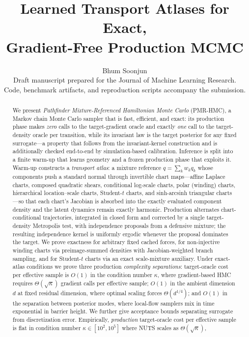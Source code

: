 \documentclass[11pt]{article}
\title{Learned Transport Atlases for Exact,\\ Gradient-Free Production MCMC}
\author{Bhum Soonjun\\[2pt]
\small Draft manuscript prepared for the Journal of Machine Learning Research.\\
\small Code, benchmark artifacts, and reproduction scripts accompany the submission.}
\date{}
\theoremstyle{remark}
\begin{document}
\maketitle

\begin{abstract}
We present \emph{Pathfinder Mixture-Referenced Hamiltonian Monte Carlo}
(PMR-HMC), a Markov chain Monte Carlo sampler that is fast, efficient, and
exact: its production phase makes \emph{zero} calls to the target-gradient
oracle and exactly \emph{one} call to the target-density oracle per
transition, while its invariant law is the target posterior for any fixed
surrogate---a property that follows from the invariant-kernel construction
and is additionally checked end-to-end by simulation-based calibration.
Inference is split into a finite warm-up that learns geometry and a frozen
production phase that exploits it. Warm-up constructs a \emph{transport
atlas}: a mixture reference $q=\sum_k w_kq_k$ whose components push a
standard normal through invertible chart maps---affine Laplace charts,
composed quadratic shears, conditional log-scale charts, polar (winding)
charts, hierarchical location--scale charts, Student-$t$ charts, and
sinh-arcsinh triangular charts---so that each chart's Jacobian is
absorbed into the exactly evaluated component density and the latent
dynamics remain exactly harmonic. Production alternates
chart-conditional trajectories, integrated in closed form and corrected
by a single target-density Metropolis test, with independence proposals
from a defensive mixture; the resulting independence kernel is
uniformly ergodic whenever the proposal dominates the target. We prove exactness for arbitrary fixed cached
forces, for non-injective winding charts via preimage-summed densities with
Jacobian-weighted branch sampling, and for Student-$t$ charts via an exact
scale-mixture auxiliary. Under exact-atlas conditions we prove three
production \emph{complexity separations}: target-oracle cost per
effective sample is $O(1)$ in the condition number $\kappa$, where
gradient-based HMC requires $\Theta(\sqrt\kappa)$ gradient calls per
effective sample; $O(1)$ in the ambient dimension $d$ at fixed residual
dimension, where optimal scaling forces $\Theta(d^{1/4})$; and $O(1)$ in
the separation between posterior modes, where local-flow samplers mix in
time exponential in barrier height. We further give acceptance bounds
separating surrogate from discretization error.
Empirically, \emph{production} target-oracle cost per effective sample
is flat in condition
number $\kappa\in[10^2,10^5]$ where NUTS scales as $\Theta(\sqrt\kappa)$,

\end{abstract}
\end{document}
